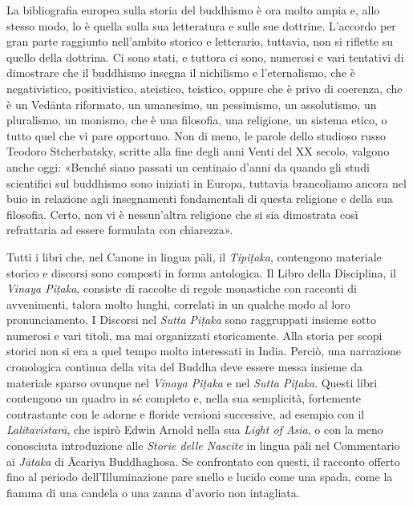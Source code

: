 La bibliografia europea sulla storia del buddhismo è ora molto ampia e,
allo stesso modo, lo è quella sulla sua letteratura e sulle sue
dottrine. L’accordo per gran parte raggiunto nell’ambito storico e
letterario, tuttavia, non si riflette su quello della dottrina. Ci sono
stati, e tuttora ci sono, numerosi e vari tentativi di dimostrare che il
buddhismo insegna il nichilismo e l’eternalismo, che è negativistico,
positivistico, ateistico, teistico, oppure che è privo di coerenza, che
è un Vedānta riformato, un umanesimo, un pessimismo, un assolutismo, un
pluralismo, un monismo, che è una filosofia, una religione, un sistema
etico, o tutto quel che vi pare opportuno. Non di meno, le parole dello
studioso russo Teodoro Stcherbatsky, scritte alla fine degli anni Venti
del XX secolo, valgono anche oggi: «Benché siano passati un centinaio
d’anni da quando gli studi scientifici sul buddhismo sono iniziati in
Europa, tuttavia brancoliamo ancora nel buio in relazione agli
insegnamenti fondamentali di questa religione e della sua filosofia.
Certo, non vi è nessun’altra religione che si sia dimostrata così
refrattaria ad essere formulata con chiarezza».

Tutti i libri che, nel Canone in lingua pāli, il \emph{Tipiṭaka}, contengono
materiale storico e discorsi sono composti in forma antologica. Il Libro
della Disciplina, il \emph{Vinaya Piṭaka}, consiste di raccolte di regole
monastiche con racconti di avvenimenti, talora molto lunghi, correlati
in un qualche modo al loro pronunciamento. I Discorsi nel \emph{Sutta Piṭaka}
sono raggruppati insieme sotto numerosi e vari titoli, ma mai
organizzati storicamente. Alla storia per scopi storici non si era a
quel tempo molto interessati in India. Perciò, una narrazione
cronologica continua della vita del Buddha deve essere messa insieme da
materiale sparso ovunque nel \emph{Vinaya Piṭaka} e nel \emph{Sutta Piṭaka}.
Questi libri contengono un quadro in sé completo e, nella sua
semplicità, fortemente contrastante con le adorne e floride versioni
successive, ad esempio con il \emph{Lalitavistarā}, che ispirò Edwin Arnold
nella sua \emph{Light of Asia}, o con la meno conosciuta introduzione alle
\emph{Storie delle Nascite} in lingua pāli nel Commentario ai \emph{Jātaka} di
Ācariya Buddhaghosa. Se confrontato con questi, il racconto offerto fino
al periodo dell’Illuminazione pare snello e lucido come una spada, come
la fiamma di una candela o una zanna d’avorio non intagliata.

